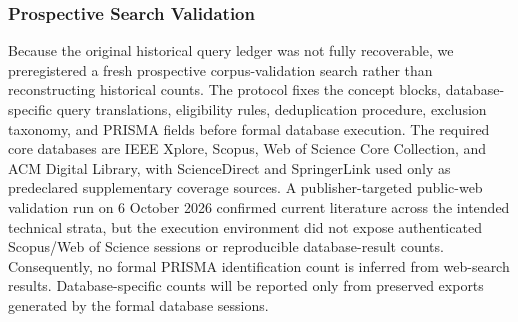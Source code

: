 \subsubsection{Prospective Search Validation}
Because the original historical query ledger was not fully recoverable, we preregistered a fresh prospective corpus-validation search rather than reconstructing historical counts. The protocol fixes the concept blocks, database-specific query translations, eligibility rules, deduplication procedure, exclusion taxonomy, and PRISMA fields before formal database execution. The required core databases are IEEE Xplore, Scopus, Web of Science Core Collection, and ACM Digital Library, with ScienceDirect and SpringerLink used only as predeclared supplementary coverage sources. A publisher-targeted public-web validation run on 6 October 2026 confirmed current literature across the intended technical strata, but the execution environment did not expose authenticated Scopus/Web of Science sessions or reproducible database-result counts. Consequently, no formal PRISMA identification count is inferred from web-search results. Database-specific counts will be reported only from preserved exports generated by the formal database sessions.
